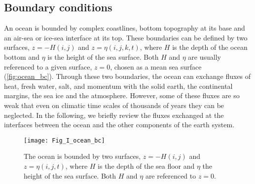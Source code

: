 \documentclass[../main/NEMO_manual]{subfiles}
\begin{document}
\subsection{Boundary conditions}
\label{subsec:PE_boundary_condition}

An ocean is bounded by complex coastlines, bottom topography at its base and
an air-sea or ice-sea interface at its top.
These boundaries can be defined by two surfaces, $z = - H(i,j)$ and $z = \eta(i,j,k,t)$,
where $H$ is the depth of the ocean bottom and $\eta$ is the height of the sea surface.
Both $H$ and $\eta$ are usually referenced to a given surface, $z = 0$, chosen as a mean sea surface
(\autoref{fig:ocean_bc}).
Through these two boundaries, the ocean can exchange fluxes of heat, fresh water, salt, and momentum with
the solid earth, the continental margins, the sea ice and the atmosphere.
However, some of these fluxes are so weak that even on climatic time scales of thousands of years
they can be neglected.
In the following, we briefly review the fluxes exchanged at the interfaces between the ocean and
the other components of the earth system.

\begin{figure}[!ht]
  \begin{center}
    \texttt{[image: Fig\_I\_ocean\_bc]}
    \caption{
      \protect\label{fig:ocean_bc}
      The ocean is bounded by two surfaces, $z = - H(i,j)$ and $z = \eta(i,j,t)$,
      where $H$ is the depth of the sea floor and $\eta$ the height of the sea surface.
      Both $H$ and $\eta$ are referenced to $z = 0$.
    }
  \end{center}
\end{figure}
\end{document}
